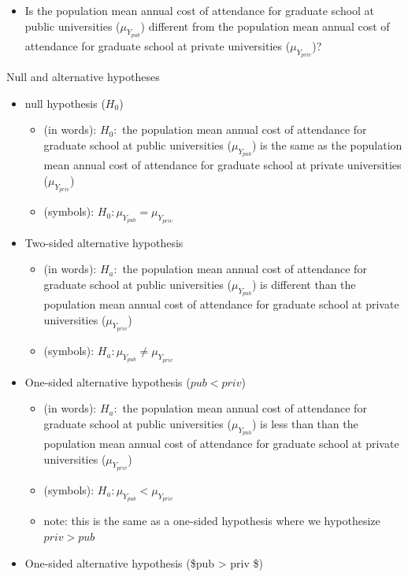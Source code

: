 \documentclass[
  letterpaper,
  DIV=11,
  numbers=noendperiod]{scrartcl}
\providecommand{\tightlist}{%
  \setlength{\itemsep}{0pt}\setlength{\parskip}{0pt}}\usepackage{longtable,booktabs,array}
\begin{document}
\begin{itemize}
\tightlist
\item
  Is the population mean annual cost of attendance for graduate school
  at public universities (\(\mu_{Y_{{pub}}}\)) different from the
  population mean annual cost of attendance for graduate school at
  private universities (\(\mu_{Y_{{priv}}}\))?
\end{itemize}

Null and alternative hypotheses

\begin{itemize}
\tightlist
\item
  null hypothesis (\(H_0\))

  \begin{itemize}
  \tightlist
  \item
    (in words): \(H_0:\) the population mean annual cost of attendance
    for graduate school at public universities (\(\mu_{Y_{{pub}}}\)) is
    the same as the population mean annual cost of attendance for
    graduate school at private universities (\(\mu_{Y_{{priv}}}\))
  \item
    (symbols): \(H_0: \mu_{Y_{{pub}}} = \mu_{Y_{{priv}}}\)
  \end{itemize}
\item
  Two-sided alternative hypothesis

  \begin{itemize}
  \tightlist
  \item
    (in words): \(H_a:\) the population mean annual cost of attendance
    for graduate school at public universities (\(\mu_{Y_{{pub}}}\)) is
    different than the population mean annual cost of attendance for
    graduate school at private universities (\(\mu_{Y_{{priv}}}\))
  \item
    (symbols): \(H_a: \mu_{Y_{{pub}}} \neq \mu_{Y_{{priv}}}\)
  \end{itemize}
\item
  One-sided alternative hypothesis (\(pub < priv\))

  \begin{itemize}
  \tightlist
  \item
    (in words): \(H_a:\) the population mean annual cost of attendance
    for graduate school at public universities (\(\mu_{Y_{{pub}}}\)) is
    less than than the population mean annual cost of attendance for
    graduate school at private universities (\(\mu_{Y_{{priv}}}\))
  \item
    (symbols): \(H_a: \mu_{Y_{{pub}}} < \mu_{Y_{{priv}}}\)
  \item
    note: this is the same as a one-sided hypothesis where we
    hypothesize \(priv > pub\)
  \end{itemize}
\item
  One-sided alternative hypothesis (\$pub \textgreater{} priv \$)


\end{itemize}
\end{document}
